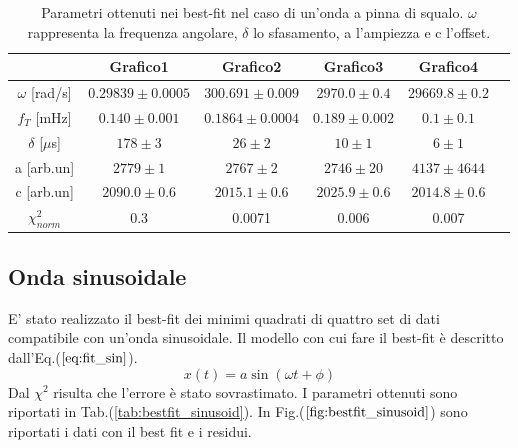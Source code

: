 \documentclass{article}
\begin{document}
                \begin{table}[H]
                    \centering
                    \begin{tabular}{cccccc}
                        \hline
                         & Grafico1 & Grafico2 & Grafico3 & Grafico4 \\
                        \hline
                        $\omega$ [rad/s]    & $0.29839 \pm 0.0005$      & $300.691\pm 0.009$    & $2970.0 \pm 0.4$      & $29669.8\pm 0.2$ \\
                        $f_T$ [mHz]         & $0.140 \pm 0.001$         & $0.1864 \pm 0.0004$   & $0.189 \pm 0.002$     & $0.1 \pm 0.1$ \\
                        $\delta$ [$\mu$s]   & $178 \pm 3$               & $26 \pm 2$            & $10\pm 1$             & $6 \pm 1$ \\
                        a [arb.un]          & $2779\pm 1$               & $2767 \pm 2$          & $2746\pm 20$          & $4137\pm 4644$ \\
                        c [arb.un]          & $2090.0 \pm 0.6 $         &$2015.1\pm 0.6$        & $2025.9 \pm 0.6$      & $2014.8 \pm 0.6$ \\
                        $\chi^{2}_{norm}$   & 0.3                       &0.0071                 & 0.006                 & 0.007\\
                        \hline
                    \end{tabular}
                    \caption{Parametri ottenuti nei best-fit nel caso di un'onda a pinna di squalo. $\omega$ rappresenta la frequenza angolare, $\delta$ lo sfasamento, a l'ampiezza e c l'offset.}
                    \label{tab:bestfit_params}
                \end{table}
    \subsection{Onda sinusoidale}
        E' stato realizzato il best-fit dei minimi quadrati
        di quattro set di dati compatibile con un'onda sinusoidale.
        Il modello con cui fare il best-fit è descritto dall'Eq.($\ref{eq:fit_sin}$).
            \begin{equation}
                x(t)=a \sin\left(\omega t+\phi\right)
                \label{eq:fit_sin}
            \end{equation} 
        Dal $\chi^2$ risulta che l'errore è stato sovrastimato. 
        I parametri ottenuti sono riportati in Tab.(\ref{tab:bestfit_sinusoid}).%
        In Fig.($\ref{fig:bestfit_sinusoid}$) sono riportati i dati con il best fit e 
        i residui.
\end{document}

